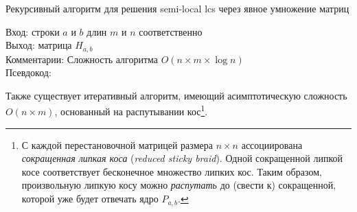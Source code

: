  \begin{algorithm}[h]
 \caption{Рекурсивный алгоритм для решения semi-local lcs через явное умножение матриц}\label{alg:monge}
 Вход: строки $a$ и $b$ длин $m$ и $n$ соответственно\\
 Выход:  матрица $H_{a,b}$\\
 Комментарии: Сложность алгоритма $O(n \times m \times \log n)$\\
 Псевдокод:

 \end{algorithm}


Также существует итеративный алгоритм, имеющий асимптотическую сложность $O(n \times m)$, основанный на распутывании кос\footnote{С каждой перестановочной матрицей размера $n \times n$ ассоциирована \emph{сокращенная липкая коса} (\emph{reduced sticky braid}). Одной сокращенной липкой косе соответствует бесконечное множество липких кос. Таким образом, произвольную липкую косу можно \emph{распутать} до (свести к) сокращенной, которой уже будет отвечать ядро $P_{a,b}$.
}.


